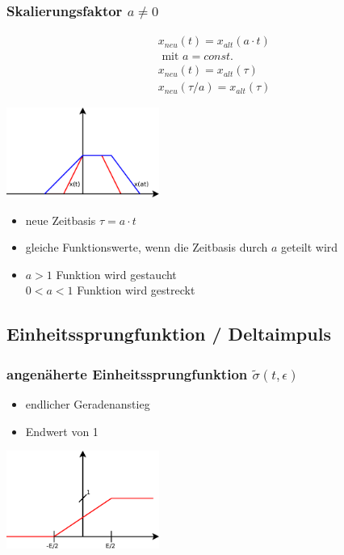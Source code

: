 \subsubsection*{Skalierungsfaktor \texorpdfstring{$a \neq 0$}{}}
\begin{multicols}{2}
\begin{align*}
  &x_{neu}\left(t\right) = x_{alt}\left(a \cdot t\right) \\
  &\text{ mit } a = const.\\
  &x_{neu}\left(t\right) = x_{alt}\left(\tau\right)\\
  &x_{neu}\left(\tau / a\right) = x_{alt}\left(\tau\right)
\end{align*}
\vfill
\begin{center}
 \includegraphics[width=50mm,keepaspectratio=true]{./Elektrotechnik/Bilder/skalierungsfaktor.pdf}
\end{center}

\end{multicols}
\begin{itemize}
 \item neue Zeitbasis \(\tau = a \cdot t\)
 \item gleiche Funktionswerte, wenn die Zeitbasis durch \(a\) geteilt wird
 \item \(a > 1\) Funktion wird gestaucht\\
       \(0 < a < 1\) Funktion wird gestreckt 
\end{itemize}

\subsection{Einheitssprungfunktion / Deltaimpuls}
\subsubsection*{angenäherte Einheitssprungfunktion
\texorpdfstring{$\tilde{\sigma}\left(t, \epsilon \right)$}{}}
\begin{multicols}{2}
 \begin{itemize}
  \item endlicher Geradenanstieg
  \item Endwert von 1
 \end{itemize}
\vfill
\begin{center}
 \includegraphics[width=50mm,keepaspectratio=true]{./Elektrotechnik/Bilder/einheitssprungang.pdf}
\end{center}
\vfill
\end{multicols}

